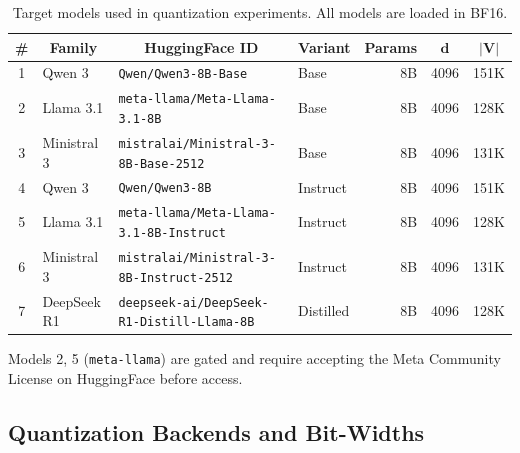 \begin{table}[h]
\centering
\caption{Target models used in quantization experiments. All models are loaded in BF16.}
\label{tab:target_models}
\small
\begin{tabular}{@{}clllrrr@{}}
\toprule
\multicolumn{1}{c}{\textbf{\#}} & \multicolumn{1}{c}{\textbf{Family}} & \multicolumn{1}{c}{\textbf{HuggingFace ID}} & \multicolumn{1}{c}{\textbf{Variant}} & \multicolumn{1}{c}{\textbf{Params}} & \multicolumn{1}{c}{$\boldsymbol{d}$} & \multicolumn{1}{c}{$\boldsymbol{|V|}$} \\
\midrule
1  & Qwen 3     & \texttt{Qwen/Qwen3-8B-Base}                         & Base      & 8B   & 4096 & 151K \\
2  & Llama 3.1  & \texttt{meta-llama/Meta-Llama-3.1-8B}               & Base      & 8B   & 4096 & 128K \\
3  & Ministral 3 & \texttt{mistralai/Ministral-3-8B-Base-2512}         & Base      & 8B   & 4096 & 131K \\
4  & Qwen 3     & \texttt{Qwen/Qwen3-8B}                              & Instruct  & 8B   & 4096 & 151K \\
5  & Llama 3.1  & \texttt{meta-llama/Meta-Llama-3.1-8B-Instruct}      & Instruct  & 8B   & 4096 & 128K \\
6  & Ministral 3 & \texttt{mistralai/Ministral-3-8B-Instruct-2512}    & Instruct  & 8B   & 4096 & 131K \\
7  & DeepSeek R1 & \texttt{deepseek-ai/DeepSeek-R1-Distill-Llama-8B} & Distilled & 8B   & 4096 & 128K \\
\bottomrule
\end{tabular}
\end{table}

\noindent
Models 2, 5 (\texttt{meta-llama}) are gated and require accepting the Meta Community License on HuggingFace before access.

\subsection{Quantization Backends and Bit-Widths}
\label{app:quant_tiers}


